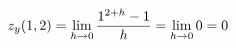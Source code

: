 \documentclass[preview]{standalone}
\begin{document}
\begin{align*}
\special{dvisvgm:raw <g id='unique000'>}z_y(1,2)=\lim_{h\to0}\frac{1^{2+h}-1}{h}=\lim_{h\to0}0=0\special{dvisvgm:raw </g>}
\end{align*}
\end{document}
